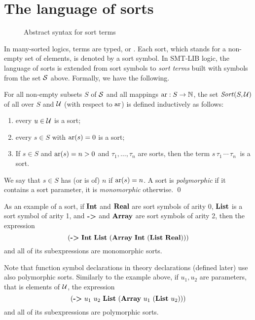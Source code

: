 \section{The language of sorts}

\begin{figure}[t]
\sortterms
\caption{Abstract syntax for sort terms}
\label{fig:abstract-sorts}
\end{figure}

In many-sorted logics, terms are typed, or . 
Each sort, which stands for a non-empty set of elements, is denoted 
by a sort symbol.
In SMT-LIB logic, the language of sorts is extended from sort symbols 
to \emph{sort terms} built with symbols from the set $\mathcal{S}$ above.
Formally, we have the following.

\begin{definition}[Sorts]
For all non-empty subsets $S$ of $\mathcal{S}$ and 
all mappings $\mathrm{ar}:S \to \mathbb{N}$,
the set $\mathit{Sort}(S, \mathcal{U})$ of all  over $S$ and $\mathcal{U}$ 
(with respect to $\mathrm{ar}$)
is defined inductively as follows:
\begin{enumerate}
\item 
every $u \in \mathcal{U}$ is a sort;
\item
every $s \in S$ with $\mathrm{ar}(s) = 0$ is a sort;
\item
If $s \in S$ and $\mathrm{ar}(s) = n > 0$ and
$\tau_1, \ldots, \tau_n$ are sorts,
then the term
$s\,\tau_1\,\cdots\,\tau_n\:$ is a sort.
\end{enumerate}
We say that $s \in S$ has (or is of)  $n$ 
if $\mathrm{ar}(s) = n$.
A sort is \emph{polymorphic} 
if it contains a sort parameter, it is \emph{monomorphic} otherwise.
\qed
\end{definition}

As an example of a sort,
if $\textbf{Int}$ and $\textbf{Real}$ are sort symbols of arity 0, 
$\textbf{List}$ is a sort symbol of arity 1, and
$\textbf{->}$ and $\textbf{Array}$ are sort symbols of arity 2,
then the expression
\[
  (\akey{->}\ \akey{Int}\ \akey{List}\ (\akey{Array}\ \akey{Int}\ (\akey{List}\ \akey{Real})))
\] 
and all of its subexpressions are monomorphic sorts.

Note that function symbol declarations in theory declarations (defined later)
use also polymorphic sorts.
Similarly to the example above,
if $u_1, u_2$ are parameters, that is elements of $\mathcal{U}$,
the expression
\[
  (\akey{->}\ u_1\ u_2\ \akey{List}\ (\akey{Array}\ u_1\ (\akey{List}\ u_2)))
\]
and all of its subexpressions are polymorphic sorts.

